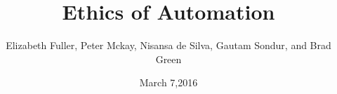 \title[Ethical Automation]{Ethics of Automation}
\author{Elizabeth Fuller, Peter Mckay, Nisansa de Silva, Gautam Sondur, and Brad Green
}

\date[March 7,2016]{March 7,2016}

\frame{\titlepage}

